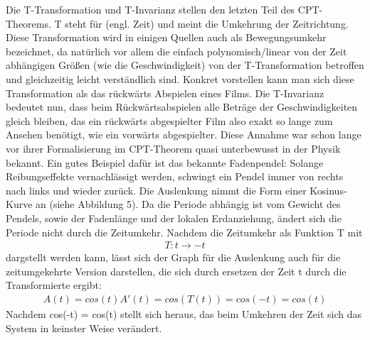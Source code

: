 \documentclass[12pt,a4paper]{scrartcl}
\numberwithin{equation}{section}
\begin{document}
Die T-Transformation und T-Invarianz stellen den letzten Teil des CPT-Theorems. T steht für \grqq{} (engl. Zeit) und meint die Umkehrung der Zeitrichtung. Diese Transformation wird in einigen Quellen auch als Bewegungsumkehr \cite{wigner32} bezeichnet, da natürlich vor allem die einfach polynomisch/linear von der Zeit abhängigen Größen (wie die Geschwindigkeit) von der T-Transformation betroffen und gleichzeitig leicht verständlich sind. Konkret vorstellen kann man sich diese Transformation als das rückwärts Abspielen eines Films. Die T-Invarianz bedeutet nun, dass beim Rückwärtsabspielen alle Beträge der Geschwindigkeiten gleich bleiben, das ein rückwärts abgespielter Film also exakt so lange zum Ansehen benötigt, wie ein vorwärts abgespielter. Diese Annahme war schon lange vor ihrer Formalisierung im CPT-Theorem quasi unterbewusst in der Physik bekannt. Ein gutes Beispiel dafür ist das bekannte Fadenpendel: Solange Reibungseffekte vernachlässigt werden, schwingt ein Pendel immer von rechts nach links und wieder zurück. Die Auslenkung nimmt die Form einer Kosinus-Kurve an (siehe Abbildung 5). Da die Periode abhängig ist vom Gewicht des Pendels, sowie der Fadenlänge und der lokalen Erdanziehung, ändert sich die Periode nicht durch die Zeitumkehr. Nachdem die Zeitumkehr als Funktion T mit
\begin{align}
  T: t \to - t
\end{align}
dargstellt werden kann, lässt sich der Graph für die Auslenkung auch für die zeitumgekehrte Version darstellen, die sich durch ersetzen der Zeit t durch die Transformierte ergibt:
\begin{align}
  A(t) = cos(t)
  A'(t) = cos(T(t)) = cos(-t) = cos(t)
\end{align}
Nachdem cos(-t) = cos(t) stellt sich heraus, das beim Umkehren der Zeit sich das System in keinster Weise verändert. \\
\end{document}
